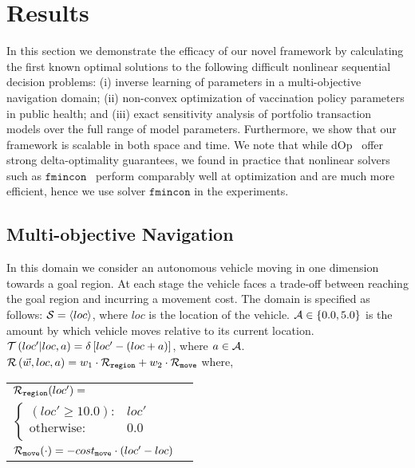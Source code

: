 \section{Results}
\label{sec:results}

In this section we demonstrate the efficacy of our novel framework by calculating the first known optimal solutions to the following difficult nonlinear sequential decision problems: (i) inverse learning of parameters in a multi-objective navigation domain; (ii) non-convex optimization of vaccination policy parameters in public health; and (iii) exact sensitivity analysis of portfolio transaction models over the full range of model parameters. Furthermore, we show that our framework is scalable in both space and time. We note that while dOp~\parencite{Gao2013} offer strong delta-optimality guarantees, we found in practice that nonlinear solvers such as $ \mathtt{fmincon} $~\parencite{MATLAB_2010} perform comparably well at optimization and are much more efficient, hence we use solver $ \mathtt{fmincon} $ in the experiments.

\subsection{Multi-objective Navigation}
\label{sec:results_navigation}

In this domain we consider an autonomous vehicle moving in one dimension towards a goal region. At each stage the vehicle faces a trade-off between reaching the goal region and incurring a movement cost. The domain is specified as follows: {\footnotesize $ \mathcal{S} = \left\langle loc \right\rangle$}, where $ loc $ is the location of the vehicle. {\footnotesize $ \mathcal{A} \in \left\lbrace 0.0, 5.0 \right\rbrace $} is the amount by which vehicle moves relative to its current location. {\footnotesize $ \mathcal{T}\left( loc' | loc, a \right) = \delta \left[ loc' - (loc + a) \right] $}, where {\footnotesize $ a \in \mathcal{A} $}. {\footnotesize $ \mathcal{R}\left(\vec{w}, loc, a \right) = w_1 \cdot \mathcal{R}_{\mathtt{region}} + w_2 \cdot \mathcal{R}_{\mathtt{move}} $} where,
{\footnotesize 
    \abovedisplayskip=10pt
    \belowdisplayskip=0pt
    \renewcommand{\arraystretch}{1.5}
    \begin{tabular}{ll}    
        $ \mathcal{R}_{\mathtt{region}}(loc') = $ &  $ $ \\
        \qquad $ \begin{cases}
        (loc' \geq 10.0 ) : & loc' \\
        \text{otherwise} : & 0.0 \\
        \end{cases} $ & $ $\\
        $ \mathcal{R}_{\mathtt{move}}(\cdot) = -cost_{\mathtt{move}} \cdot (loc' - loc)$ & $ $ \\                        
    \end{tabular}
} 


